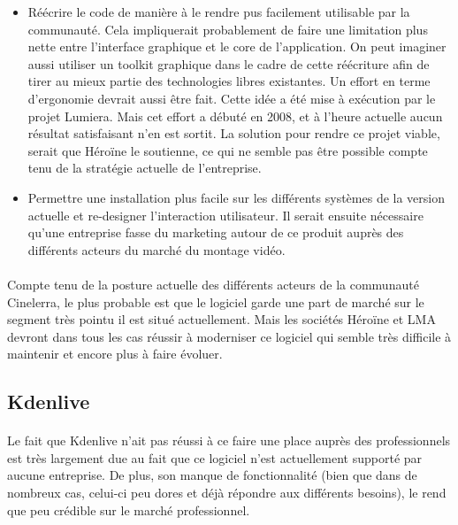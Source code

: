 \begin{itemize}

  \item {Réécrire le code de manière à le rendre pus facilement
    utilisable par la communauté. Cela impliquerait probablement de faire
    une limitation plus nette entre l'interface graphique et le core de
    l'application. On peut imaginer aussi utiliser un toolkit graphique
    dans le cadre de cette réécriture afin de tirer au mieux partie
    des technologies libres existantes. Un effort en terme d'ergonomie
    devrait aussi être fait. Cette idée a été mise à exécution par
    le projet Lumiera. Mais cet effort a débuté en 2008, et à l'heure
    actuelle aucun résultat satisfaisant n'en est sortit. La solution
    pour rendre ce projet viable, serait que Héroïne le soutienne,
    ce qui ne semble pas être possible compte tenu de la stratégie
    actuelle de l'entreprise.}


  \item {Permettre une installation plus facile sur les différents
  systèmes de la version actuelle et re-designer l'interaction
  utilisateur. Il serait
    ensuite nécessaire qu'une entreprise fasse du marketing autour de ce
    produit auprès des différents acteurs du marché du montage vidéo.}

\end{itemize}

\paragraph {}

Compte tenu de la posture actuelle des différents acteurs de la
communauté Cinelerra, le plus probable est que le logiciel garde une part
de marché sur le segment très pointu il est situé actuellement. Mais
les sociétés Héroïne et LMA devront dans tous les cas réussir à
moderniser ce logiciel qui semble très difficile à maintenir et encore
plus à faire évoluer.

\subsection {Kdenlive}

\paragraph{}

Le fait que Kdenlive n'ait pas réussi à ce faire une place auprès des
professionnels est très largement due au fait que ce logiciel n'est
actuellement supporté par aucune entreprise. De plus, son manque de
fonctionnalité (bien que dans de nombreux cas, celui-ci peu dores et
déjà répondre aux différents besoins), le rend que peu crédible
sur le marché professionnel.

